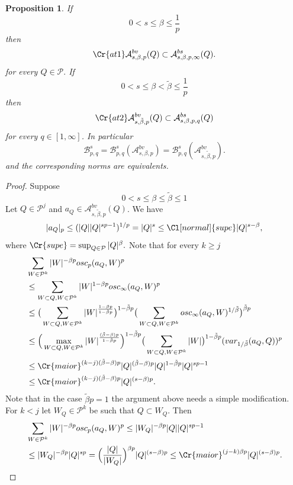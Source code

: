 \documentclass{amsart}
\newtheorem{proposition}[theorem]{Proposition}
\theoremstyle{definition}
\newcommand{\Cll}[2][normal]{\Cl[#1]{#2}}
\newcommand{\Crr}[1]{\Cr{#1}}
\begin{document}
\begin{proposition}  If 
$$0< s\leq \beta \leq \frac{1}{p}$$
then  $$\Crr{at1} \mathcal{A}^{bv}_{s, \beta,p}(Q)\subset \mathcal{A}^{bs}_{s,\beta,p,\infty}(Q).$$
for every $Q\in \mathcal{P}.$
If $$0< s\leq \beta < \tilde{\beta} \leq   \frac{1}{p}$$           
then  $$\Crr{at2} \mathcal{A}^{bv}_{s, \tilde{\beta},p}(Q)\subset \mathcal{A}^{bs}_{s,\beta,p,q}(Q)$$
for every $q \in [1,\infty]$. In particular
$$\mathcal{B}^s_{p,q}= \mathcal{B}^s_{p,q}(\mathcal{A}^{bv}_{s, \beta,p})=\mathcal{B}^s_{p,q}(\mathcal{A}^{bv}_{s, \tilde{\beta},p}).$$
and the corresponding norms are equivalents.
\end{proposition} 
\begin{proof} Suppose
$$0< s \leq  \beta  \leq \tilde{\beta}\leq 1$$
Let  $Q\in \mathcal{P}^j$ and $a_Q\in \mathcal{A}^{bv}_{s, \tilde{\beta},p}(Q)$. We have
$$|a_Q|_p\leq (   |Q||Q|^{sp-1}   )^{1/p}=|Q|^s\leq \Cll{supe} |Q|^{s-\beta},$$
where $\Crr{supe}= \sup_{Q\in \mathcal{P}} |Q|^\beta.$
Note that  for every $k\geq j$
\begin{align*}
&\sum_{W\in \mathcal{P}^k} |W|^{-\beta p} osc_p(a_Q,W)^p  \\
 &\leq  
\sum_{W \subset Q, W\in \mathcal{P}^k} |W|^{1-\beta p} osc_\infty(a_Q,W)^p  \\
&\leq \big( \sum_{W \subset Q, W\in \mathcal{P}^k}  |W|^{\frac{1-\beta p}{1-\tilde{\beta} p}} \big)^{1-\tilde{\beta} p}  \big( \sum_{W \subset Q, W\in \mathcal{P}^k}   osc_\infty(a_Q,W)^{1/\tilde{\beta}}   \big)^{\tilde{\beta} p} \\ 
&\leq   \Big( \max_{W \subset Q, W\in \mathcal{P}^k} |W|^{\frac{(\tilde{\beta}-\beta) p}{1-\tilde{\beta} p} } \Big)^{1-\tilde{\beta} p}  \big( \sum_{W \subset Q, W\in \mathcal{P}^k}  |W| \big)^{1-\tilde{\beta} p}   (var_{1/\tilde{\beta}}(a_Q,Q))^{p}  \\
&\leq \Crr{maior}^{(k-j)(\tilde{\beta}-\beta)p}|Q|^{(\tilde{\beta}-\beta)p}   |Q|^{1-\tilde{\beta} p} |Q|^{sp-1}\\
&\leq \Crr{maior}^{(k-j)(\tilde{\beta}-\beta)p}  |Q|^{(s-\beta) p}.
\end{align*}
Note that in the case  $\tilde{\beta}p=1$ the argument above needs a simple modification. For $k < j$ let $W_Q\in \mathcal{P}^k$ be such that $Q\subset W_Q$. Then 
\begin{align*}
&\sum_{W\in \mathcal{P}^k} |W|^{-\beta p} osc_p(a_Q,W)^p \leq  |W_Q|^{-\beta p} |Q|  |Q|^{sp -1}   \\
&\leq  |W_Q|^{-\beta p} |Q|^{sp}  =  \Big( \frac{|Q|}{|W_Q|}\Big)^{\beta p}  |Q|^{(s-\beta)p}\leq \Crr{maior}^{(j-k)\beta p}  |Q|^{(s-\beta)p}.

\end{align*}
\end{proof}
\end{document}
